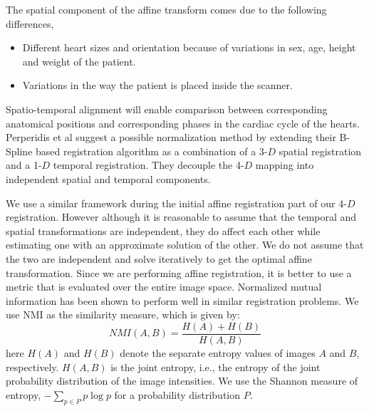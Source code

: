 The spatial component of the affine transform comes due to the following differences,
\begin{itemize}
	\item Different heart sizes and orientation because of variations in sex, age, height and weight of the patient.
	\item Variations in the way the patient is placed inside the scanner.
\end{itemize}

Spatio-temporal alignment will enable comparison between corresponding anatomical positions and corresponding phases in the cardiac cycle of the hearts. Perperidis et al suggest a possible normalization method \cite{perperidis04} by extending their B-Spline based registration algorithm as a combination of a 3-$D$ spatial registration and a 1-$D$ temporal registration. They decouple the 4-$D$ mapping into independent spatial and temporal components. 

%

We use a similar framework during the initial affine registration part of our 4-$D$ registration. However although it is reasonable to assume that the temporal and spatial transformations are independent, they do affect each other while estimating one with an approximate solution of the other. We do not assume that the two are independent and solve iteratively to get the optimal affine transformation. Since we are performing affine registration, it is better to use a metric that is evaluated over the entire image space. Normalized mutual information \cite{stud99} has been shown to perform well in similar registration problems. We use NMI as the similarity measure, which is given by:
\begin{equation}
NMI(A, B) = \frac{H(A) + H(B)}{H(A,B)}
\end{equation}
here $H(A)$ and $H(B)$ denote the separate entropy values of images $A$ and $B$, respectively. $H(A,B)$ is the joint entropy, i.e., the entropy of the joint probability distribution of the image intensities. We use the Shannon measure of entropy, $-\sum_{p\in P}p\log p$ for a probability distribution $P$.

